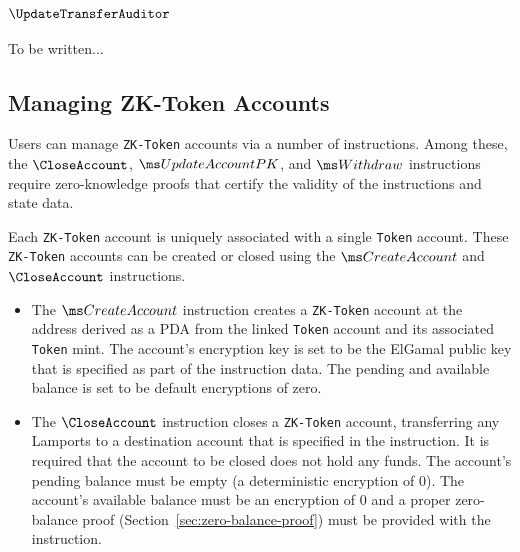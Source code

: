 \subsubsection{$\UpdateTransferAuditor$}
To be written...

\endgroup

\newpage
\subsection{Managing ZK-Token Accounts}
Users can manage \texttt{ZK-Token} accounts via a number of instructions. Among
these, the $\CloseAccount$, $\UpdateAccountPK$, and $\Withdraw$
instructions require zero-knowledge proofs that certify the validity of the
instructions and state data.

Each \texttt{ZK-Token} account is uniquely associated with a single
\texttt{Token} account. These \texttt{ZK-Token} accounts can be created or closed
using the $\CreateAccount$ and $\CloseAccount$ instructions.
\begin{itemize}
  \item The $\CreateAccount$ instruction creates a \texttt{ZK-Token} account at the 
    address derived as a PDA from the linked \texttt{Token} account
    and its associated \texttt{Token} mint. The account's encryption key is set
    to be the ElGamal public key that is specified as part of the
    instruction data. The pending and available balance is set to be default
    encryptions of zero.

  \item The $\CloseAccount$ instruction closes a \texttt{ZK-Token} account,
    transferring any Lamports to a destination account that is specified in the
    instruction. It is required that the account to be closed does not hold any
    funds. The account's pending balance must be empty (a deterministic
    encryption of 0). The account's available balance must be an encryption of 0
    and a proper zero-balance proof (Section~\ref{sec:zero-balance-proof}) must
    be provided with the instruction.
\end{itemize}

